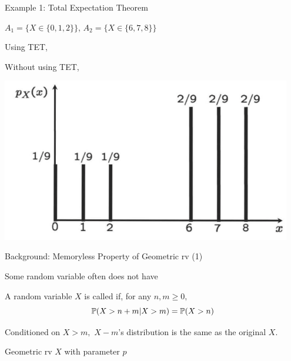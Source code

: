 \documentclass[fleqn,aspectratio=169]{beamer}
\begin{document}
\begin{frame}{Example 1: Total Expectation Theorem}

{
\plitemsep 0.1in
\bci 

\item $A_1 = \{X \in \{0,1,2\} \}$, $A_2 = \{ X \in \{6,7,8\} \}$ 

\item<2-> Using TET,  
\item<3-> Without using TET, 
\eci 
}
{
\centering
\includegraphics[width=0.95\textwidth]{L3_total_exp_ex.png}
}

\end{frame}


\begin{frame}{Background: Memoryless Property of Geometric rv (1)}

\plitemsep 0.1in
\bci 

\item<1-> Some random variable often does not have 

\item<2->  A random variable $X$ is called  if, for any $n,m \ge 0,$ $$\mathbb{P}( X > n+m | X > m ) = \mathbb{P}( X > n )$$

\item<3->  Conditioned on $X > m,$ $X-m$'s distribution is the same as the original $X.$

\item<4->  Geometric rv $X$ with parameter $p$
\eci

\end{frame}
\end{document}
